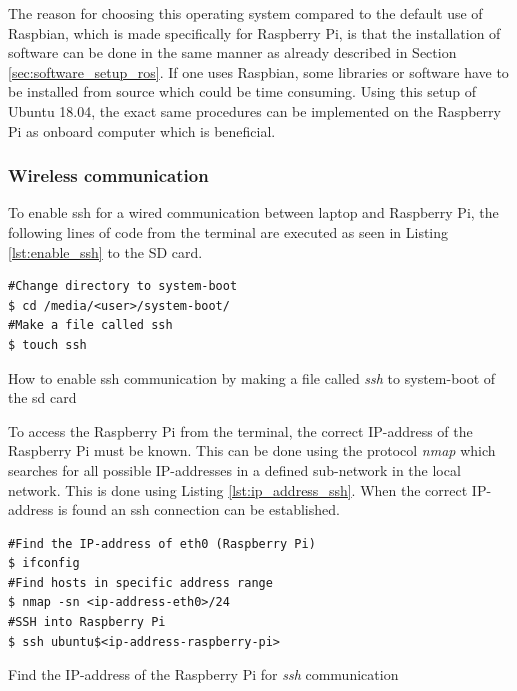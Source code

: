 \documentclass[../Head/report.tex]{subfiles}
\begin{document}
The reason for choosing this operating system compared to the default use of Raspbian, which is made specifically for Raspberry Pi, is that the installation of software can be done in the same manner as already described in Section \ref{sec:software_setup_ros}. If one uses Raspbian, some libraries or software have to be installed from source which could be time consuming. Using this setup of Ubuntu 18.04, the exact same procedures can be implemented on the Raspberry Pi as onboard computer which is beneficial. 

\subsubsection{Wireless communication}
\label{sec:wireless_communication_pi}
To enable ssh for a wired communication between laptop and Raspberry Pi, the following lines of code from the terminal are executed as seen in Listing \ref{lst:enable_ssh} to the SD card.      

\begin{listing}[H] 
\begin{tcolorbox}[
    enhanced,
    attach boxed title to top left={xshift=6mm,yshift=-3mm},
    colback=lightgreen!20,
    colframe=lightgreen,
    fonttitle=\bfseries\color{black},
]
\begin{verbatim}
#Change directory to system-boot
$ cd /media/<user>/system-boot/
#Make a file called ssh
$ touch ssh
\end{verbatim}
\end{tcolorbox}
\caption{How to enable ssh communication by making a file called \textit{ssh} to system-boot of the sd card}
\label{lst:enable_ssh}    
\end{listing}  

To access the Raspberry Pi from the terminal, the correct IP-address of the Raspberry Pi must be known. This can be done using the protocol \textit{nmap} which searches for all possible IP-addresses in a defined sub-network in the local network. This is done using Listing \ref{lst:ip_address_ssh}. When the correct IP-address is found an ssh connection can be established. 

\begin{listing}[H] 
\begin{tcolorbox}[
    enhanced,
    attach boxed title to top left={xshift=6mm,yshift=-3mm},
    colback=lightgreen!20,
    colframe=lightgreen,
    fonttitle=\bfseries\color{black},
]
\begin{verbatim}
#Find the IP-address of eth0 (Raspberry Pi) 
$ ifconfig	
#Find hosts in specific address range 
$ nmap -sn <ip-address-eth0>/24
#SSH into Raspberry Pi 
$ ssh ubuntu$<ip-address-raspberry-pi>
\end{verbatim}
\end{tcolorbox}
\caption{Find the IP-address of the Raspberry Pi for \textit{ssh} communication}
\label{lst:ip_address_ssh}    
\end{listing}  
\end{document}
